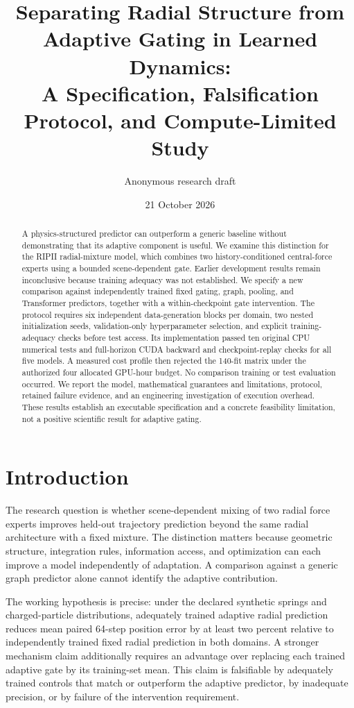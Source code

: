 \documentclass[10pt]{article}
\title{Separating Radial Structure from Adaptive Gating in Learned Dynamics:\\A Specification, Falsification Protocol, and Compute-Limited Study}
\author{Anonymous research draft}
\date{21 October 2026}
\begin{document}
\maketitle
\begin{abstract}
A physics-structured predictor can outperform a generic baseline without demonstrating that its adaptive component is useful. We examine this distinction for the RIPII radial-mixture model, which combines two history-conditioned central-force experts using a bounded scene-dependent gate. Earlier development results remain inconclusive because training adequacy was not established. We specify a new comparison against independently trained fixed gating, graph, pooling, and Transformer predictors, together with a within-checkpoint gate intervention. The protocol requires six independent data-generation blocks per domain, two nested initialization seeds, validation-only hyperparameter selection, and explicit training-adequacy checks before test access. Its implementation passed ten original CPU numerical tests and full-horizon CUDA backward and checkpoint-replay checks for all five models. A measured cost profile then rejected the 140-fit matrix under the authorized four allocated GPU-hour budget. No comparison training or test evaluation occurred. We report the model, mathematical guarantees and limitations, protocol, retained failure evidence, and an engineering investigation of execution overhead. These results establish an executable specification and a concrete feasibility limitation, not a positive scientific result for adaptive gating.
\end{abstract}

\section{Introduction}
The research question is whether scene-dependent mixing of two radial force experts improves held-out trajectory prediction beyond the same radial architecture with a fixed mixture. The distinction matters because geometric structure, integration rules, information access, and optimization can each improve a model independently of adaptation. A comparison against a generic graph predictor alone cannot identify the adaptive contribution.

The working hypothesis is precise: under the declared synthetic springs and charged-particle distributions, adequately trained adaptive radial prediction reduces mean paired 64-step position error by at least two percent relative to independently trained fixed radial prediction in both domains. A stronger mechanism claim additionally requires an advantage over replacing each trained adaptive gate by its training-set mean. This claim is falsifiable by adequately trained controls that match or outperform the adaptive predictor, by inadequate precision, or by failure of the intervention requirement.
\end{document}
